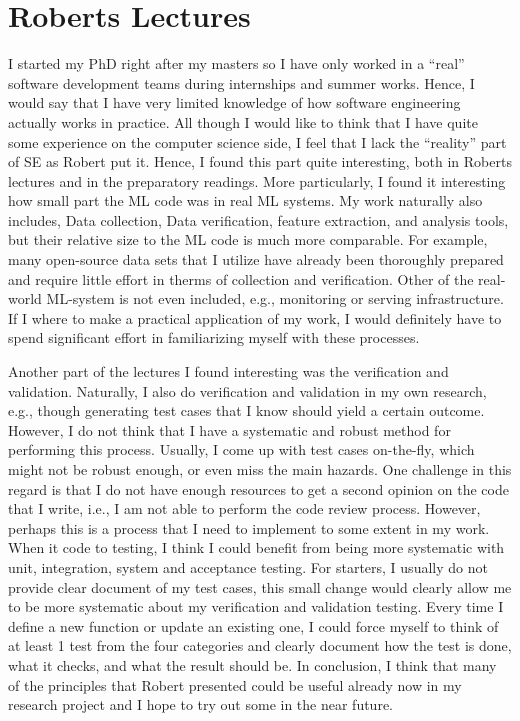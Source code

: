\documentclass[a4paper,11pt]{article}
\begin{document}
\section{Roberts Lectures}
I started my PhD right after my masters so I have only worked in a ``real'' software development teams during internships and summer works. Hence, I would say that I have very limited knowledge of how software engineering actually works in practice. All though I would like to think that I have quite some experience on the computer science side, I feel that I lack the ``reality'' part of SE as Robert put it. Hence, I found this part quite interesting, both in Roberts lectures and in the preparatory readings. More particularly, I found it interesting how small part the ML code was in real ML systems. My work naturally also includes, Data collection, Data verification, feature extraction, and analysis tools, but their relative size to the ML code is much more comparable. For example, many open-source data sets that I utilize have already been thoroughly prepared and require little effort in therms of collection and verification. Other of the real-world ML-system is not even included, e.g., monitoring or serving infrastructure. If I where to make a practical application of my work, I would definitely have to spend significant effort in familiarizing myself with these processes.

Another part of the lectures I found interesting was the verification and validation. Naturally, I also do verification and validation in my own research, e.g., though generating test cases that I know should yield a certain outcome. However, I do not think that I have a systematic and robust method for performing this process. Usually, I come up with test cases on-the-fly, which might not be robust enough, or even miss the main hazards. One challenge in this regard is that I do not have enough resources to get a second opinion on the code that I write, i.e., I am not able to perform the code review process. However, perhaps this is a process that I need to implement to some extent in my work. When it code to testing, I think I could benefit from being more systematic with unit, integration, system and acceptance testing. For starters, I usually do not provide clear document of my test cases, this small change would clearly allow me to be more systematic about my verification and validation testing. Every time I define a new function or update an existing one, I could force myself to think of at least 1 test from the four categories and clearly document how the test is done, what it checks, and what the result should be. In conclusion, I think that many of the principles that Robert presented could be useful already now in my research project and I hope to try out some in the near future.
\end{document}
